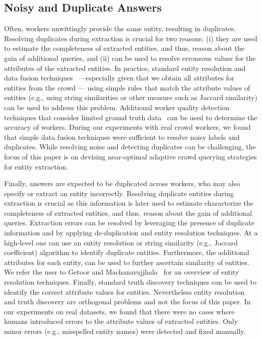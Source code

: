 \subsection{Noisy and Duplicate Answers} 
Often, workers unwittingly provide the same entity, resulting in duplicates. Resolving duplicates during extraction is crucial for two reasons: (i) they are used to estimate the completeness of extracted entities, and thus, reason about the gain of additional queries, and (ii) can be used to resolve erroneous values for the attributes of the extracted entities. In practice, standard entity resolution and data fusion techniques~\cite{getoor:kdd13} ---especially given that we obtain all attributes for entities from the crowd ---  using simple rules that match the attribute values of entities (e.g., using string similarities or other measure such as Jaccard similarity) can be used to address this problem. Additional worker quality detection techniques that consider limited ground truth data~\cite{donmez-learning-inference} can be used to determine the accuracy of workers. During our experiments with real crowd workers, we found that simple data fusion techniques were sufficient to resolve noisy labels and duplicates. While resolving noise and detecting duplicates can be challenging, the focus of this paper is on devising near-optimal adaptive crowd querying strategies for entity extraction. 

\iftr
Finally, answers are expected to be duplicated across workers, who may also specify or extract an entity incorrectly. Resolving duplicate entities during extraction is crucial as this information is later used to estimate characterize the completeness of extracted entities, and thus, reason about the gain of additional queries.  Extraction errors can be resolved by leveraging the presence of duplicate information and by applying de-duplication and entity resolution techniques. At a high-level one can use an entity resolution or string similarity (e.g., Jaccard coefficient) algorithm to identify duplicate entities. Furthermore, the additional attributes for each entity, can be used to further ascertain similarity of entities. We refer the user to Getoor and Machanavajjhala~\cite{getoor:kdd13} for an overview of entity resolution techniques. Finally, standard truth discovery techniques can be used to identify the correct attribute values for entities. Nevertheless entity resolution and truth discovery are orthogonal problems and not the focus of this paper. In our experiments on real datasets, we found that there were no cases where humans introduced errors to the attribute values of extracted entities. Only minor errors (e.g., misspelled entity names) were detected and fixed manually. \fi

